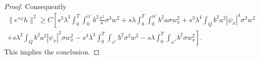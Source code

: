 \documentclass[11pt,oneside,a4papper]{osajnl}
\begin{document}
\begin{proof}
	Consequently
	\begin{multline*}
		\|e^{s\varphi} h\|^2 \geq C \left[ s^3 \lambda^3 \int_0^T \int_0^{\alpha'} b^2 \frac{x^2}{a} \sigma^3 w^2 +s \lambda \int_0^T \int_0^{\alpha'} b^2 a \sigma w_x^2+s^3 \lambda^4 \int_Q b^2 a^2|\psi_x|^4 \sigma^3 w^2\right. \\
		\left.+s \lambda^2 \int_Q b^2 a^2 |\psi_x|^2 \sigma w_x^2
		- s^3\lambda^3 \int_0^T\int_{\omega'} b^2 \sigma^3 w^2-s\lambda\int_0^T\int_{\omega'} b^2  \sigma w_x^2\right].
	\end{multline*}
	This implies the conclusion.
\end{proof}
\end{document}
